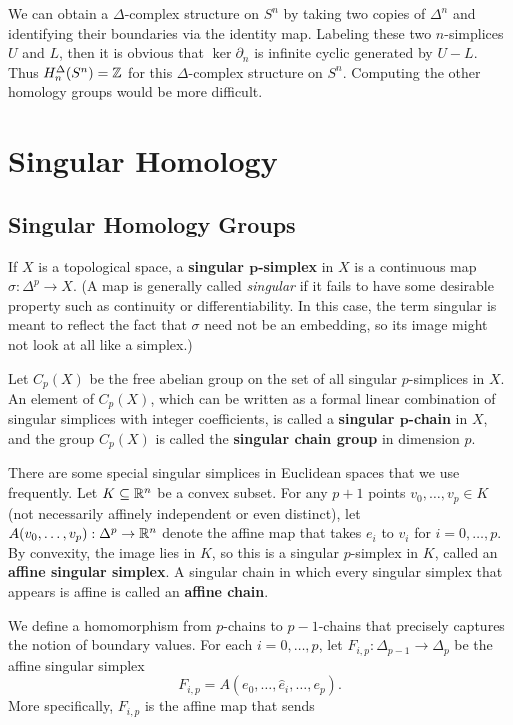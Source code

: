 \begin{example}
We can obtain a $\Delta$-complex structure on $S^n$ by taking two copies of $\Delta^n$ and identifying their boundaries via the identity map. Labeling these two $n$-simplices $U$ and $L$, then it is obvious that $\ker\partial_n$ is infinite cyclic generated by $U-L$. Thus $H^\Delta_n(S^n)=\mathbb{Z}$ for this $\Delta$-complex structure on $S^n$. Computing the other homology groups would be more difficult.
\end{example}
\section{Singular Homology}
\subsection{Singular Homology Groups}
 If $X$ is a topological space, a \textbf{singular $\bm{p}$-simplex} in $X$ is a continuous map $\sigma:\Delta^p\to X$. (A map is generally called \textit{singular} if it fails to have some desirable property such as continuity or differentiability. In this case, the term singular is meant to reflect the fact that $\sigma$ need not be
an embedding, so its image might not look at all like a simplex.)\par
Let $C_p(X)$ be the free abelian group on the set of all singular $p$-simplices in $X$. An element of $C_p(X)$, which can be written as a formal linear combination of singular simplices with integer coefficients, is called a \textbf{singular $\bm{p}$-chain} in $X$, and the group $C_p(X)$ is called the \textbf{singular chain group} in dimension $p$.\par
There are some special singular simplices in Euclidean spaces that we use frequently. Let $K\subseteq\mathbb{R}^n$ be a convex subset. For any $p+1$ points $v_0,\dots,v_p\in K$ (not necessarily affinely independent or even distinct), let $A(v_0,\dots,v_p):\Delta^p\to\mathbb{R}^n$ denote
the affine map that takes $e_i$ to $v_i$ for $i=0,\dots,p$. By convexity, the image lies in $K$, so this is a singular $p$-simplex in $K$, called an \textbf{affine singular simplex}. A singular chain in which every singular simplex that appears is affine is called an \textbf{affine chain}.\par
We define a homomorphism from $p$-chains to $p-1$-chains that precisely captures the notion of boundary values. For each $i=0,\dots,p$, let $F_{i,p}:\Delta_{p-1}\to\Delta_{p}$ be the affine singular simplex
\[F_{i,p}=A(e_0,\dots,\widehat{e}_i,\dots,e_p).\]
More specifically, $F_{i,p}$ is the affine map that sends
